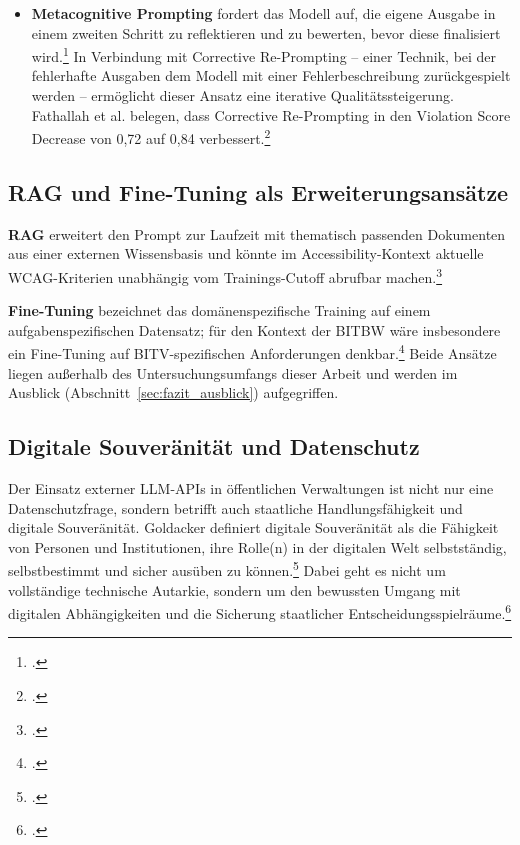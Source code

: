 \begin{itemize}
    \item \textbf{Metacognitive Prompting} fordert das Modell auf, die eigene Ausgabe in einem zweiten Schritt zu reflektieren und zu bewerten, bevor diese finalisiert wird.\footcites[Vgl.][]{wangMetacognitivePromptingImproves2024}[][S. 8--9]{schulhoff2024promptreport} In Verbindung mit Corrective Re-Prompting -- einer Technik, bei der fehlerhafte Ausgaben dem Modell mit einer Fehlerbeschreibung zurückgespielt werden -- ermöglicht dieser Ansatz eine iterative Qualitätssteigerung. Fathallah et al. belegen, dass Corrective Re-Prompting in  den Violation Score Decrease von 0,72 auf 0,84 verbessert.\footcite[Vgl.][]{fathallah_accessguru_2025}
\end{itemize}


\subsection{\acs{RAG} und Fine-Tuning als Erweiterungsansätze}

\textbf{\acf{RAG}} erweitert den Prompt zur Laufzeit mit thematisch passenden Dokumenten aus einer externen Wissensbasis und könnte im Accessibility-Kontext aktuelle \ac{WCAG}-Kriterien unabhängig vom Trainings-Cutoff abrufbar machen.\footcite[Vgl.][S. 1--2]{lewisRetrievalAugmentedGenerationKnowledgeIntensive2021}

\textbf{Fine-Tuning} bezeichnet das domänenspezifische Training auf einem aufgabenspezifischen Datensatz; für den Kontext der \ac{BITBW} wäre insbesondere ein Fine-Tuning auf \ac{BITV}-spezifischen Anforderungen denkbar.\footcite[Vgl.][S. 90]{silvestreSystemsOpportunitiesLLM2025} Beide Ansätze liegen außerhalb des Untersuchungsumfangs dieser Arbeit und werden im Ausblick (Abschnitt~\ref{sec:fazit_ausblick}) aufgegriffen.

\subsection{Digitale Souveränität und Datenschutz}
\label{datenschutz}

Der Einsatz externer \ac{LLM}-\ac{API}s in öffentlichen Verwaltungen ist nicht nur eine Datenschutzfrage, sondern betrifft auch staatliche Handlungsfähigkeit und digitale Souveränität. Goldacker definiert digitale Souveränität als die Fähigkeit von Personen und Institutionen, ihre Rolle(n) in der digitalen Welt selbstständig, selbstbestimmt und sicher ausüben zu können.\footcite[Vgl.][S.~7]{goldackerDigitaleSouveraenitaet} Dabei geht es nicht um vollständige technische Autarkie, sondern um den bewussten Umgang mit digitalen Abhängigkeiten und die Sicherung staatlicher Entscheidungsspielräume.\footcite[Vgl.][S.~5--6]{mohabbatkarThapaDigitaleSouveraenitaet2020}

